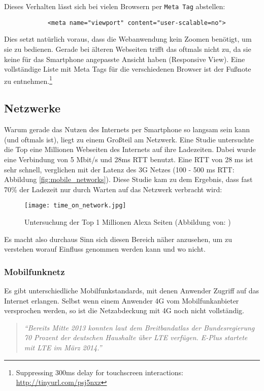 		Dieses Verhalten lässt sich bei vielen Browsern per \texttt{Meta Tag} abstellen:

		\begin{lstlisting}
			<meta name="viewport" content="user-scalable=no">
		\end{lstlisting}

		Dies setzt natürlich voraus, dass die Webanwendung kein Zoomen benötigt, um sie zu bedienen. Gerade bei älteren Webseiten trifft das oftmals nicht zu, da sie keine für das Smartphone angepasste Ansicht haben (Responsive View). Eine vollständige Liste mit Meta Tags für die verschiedenen Browser ist der Fußnote zu entnehmen.\footnote{Suppressing 300ms delay for touchscreen interactions: \url{http://tinyurl.com/psj5nxz}}


	\subsection{Netzwerke} %
	\label{sub:netzwerke}
		Warum gerade das Nutzen des Internets per Smartphone so langsam sein kann (und oftmals ist), liegt zu einem Großteil am Netzwerk. Eine Studie untersuchte die Top eine Millionen Webseiten des Internets auf ihre Ladezeiten. Dabei wurde eine Verbindung von 5 Mbit/s und 28ms RTT benutzt. Eine RTT von 28 ms ist sehr schnell, verglichen mit der Latenz des 3G Netzes (100 - 500 ms RTT: Abbildung \ref{fig:mobile_networks}). Diese Studie kam zu dem Ergebnis, dass fast 70\% der Ladezeit nur durch Warten auf das Netzwerk verbracht wird:

		\begin{figure}[htbp]
			\begin{center}
				\texttt{[image: time\_on\_network.jpg]}
				\caption{Untersuchung der Top 1 Millionen Alexa Seiten (Abbildung von: \autocite{alexa})}
				\label{fig:time_on_network}
			\end{center}
		\end{figure}

		Es macht also durchaus Sinn sich diesen Bereich näher anzusehen, um zu verstehen worauf Einfluss genommen werden kann und wo nicht.

		\subsubsection{Mobilfunknetz} %
		\label{ssub:Mobilfunknetz}
			Es gibt unterschiedliche Mobilfunkstandards, mit denen Anwender Zugriff auf das Internet erlangen. Selbst wenn einem Anwender 4G vom Mobilfunkanbieter versprochen werden, so ist die Netzabdeckung mit 4G noch nicht vollständig.
			\begin{quote}
				\textit{"`Bereits Mitte 2013 konnten laut dem Breitbandatlas der Bundesregierung 70 Prozent der deutschen Haushalte über LTE verfügen. E-Plus startete mit LTE im März 2014."' \autocite{netzagentur}}
			\end{quote}

